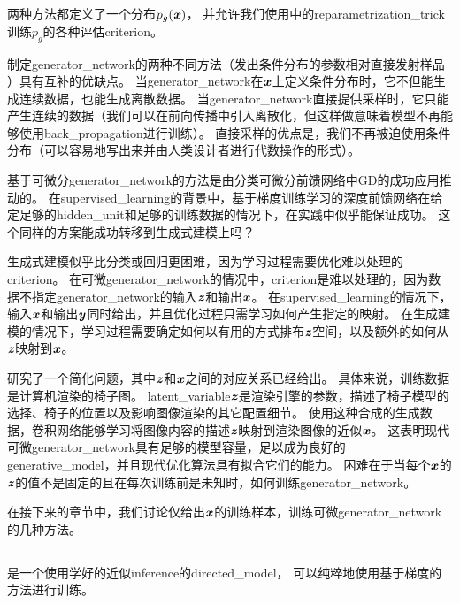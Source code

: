 两种方法都定义了一个分布$p_g(\boldsymbol{\mathit{x}})$， 并允许我们使用中的\gls{reparametrization_trick}训练$p_g$的各种评估\gls{criterion}。


制定\gls{generator_network}的两种不同方法（发出条件分布的参数相对直接发射样品 ）具有互补的优缺点。
当\gls{generator_network}在$\boldsymbol{\mathit{x}}$上定义条件分布时，它不但能生成连续数据，也能生成离散数据。
当\gls{generator_network}直接提供采样时，它只能产生连续的数据（我们可以在前向传播中引入离散化，但这样做意味着模型不再能够使用\gls{back_propagation}进行训练）。
直接采样的优点是，我们不再被迫使用条件分布（可以容易地写出来并由人类设计者进行代数操作的形式）。

基于可微分\gls{generator_network}的方法是由分类可微分前馈网络中\gls{GD}的成功应用推动的。
在\gls{supervised_learning}的背景中，基于梯度训练学习的深度前馈网络在给定足够的\gls{hidden_unit}和足够的训练数据的情况下，在实践中似乎能保证成功。
这个同样的方案能成功转移到生成式建模上吗？

生成式建模似乎比分类或回归更困难，因为学习过程需要优化难以处理的\gls{criterion}。
在可微\gls{generator_network}的情况中，\gls{criterion}是难以处理的，因为数据不指定\gls{generator_network}的输入$\boldsymbol{\mathit{z}}$和输出$\boldsymbol{\mathit{x}}$。
在\gls{supervised_learning}的情况下，输入$\boldsymbol{\mathit{x}}$和输出$\boldsymbol{\mathit{y}}$同时给出，并且优化过程只需学习如何产生指定的映射。
在生成建模的情况下，学习过程需要确定如何以有用的方式排布$\boldsymbol{\mathit{z}}$空间，以及额外的如何从$\boldsymbol{\mathit{z}}$映射到$\boldsymbol{\mathit{x}}$。

\citet{dosovitskiy2015learning}研究了一个简化问题，其中$\boldsymbol{\mathit{z}}$和$\boldsymbol{\mathit{x}}$之间的对应关系已经给出。
具体来说，训练数据是计算机渲染的椅子图。
\gls{latent_variable}$\boldsymbol{\mathit{z}}$是渲染引擎的参数，描述了椅子模型的选择、椅子的位置以及影响图像渲染的其它配置细节。
使用这种合成的生成数据，卷积网络能够学习将图像内容的描述$\boldsymbol{\mathit{z}}$映射到渲染图像的近似$\boldsymbol{\mathit{x}}$。
这表明现代可微\gls{generator_network}具有足够的模型容量，足以成为良好的\gls{generative_model}，并且现代优化算法具有拟合它们的能力。
困难在于当每个$\boldsymbol{\mathit{x}}$的$\boldsymbol{\mathit{z}}$的值不是固定的且在每次训练前是未知时，如何训练\gls{generator_network}。


在接下来的章节中，我们讨论仅给出$\boldsymbol{\mathit{x}}$的训练样本，训练可微\gls{generator_network}的几种方法。


\subsection{}
\label{sec:variational_autoencoders}
\citep{Kingma-arxiv2013,Rezende-et-al-ICML2014}是一个使用学好的近似\gls{inference}的\gls{directed_model}， 可以纯粹地使用基于梯度的方法进行训练。


